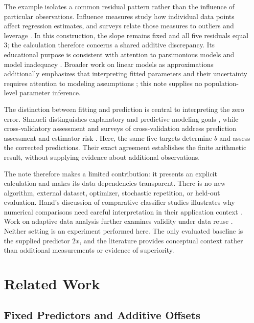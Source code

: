 \documentclass[11pt]{article}
\begin{document}
The example isolates a common residual pattern rather than the influence of particular observations. Influence measures study how individual data points affect regression estimates, and surveys relate those measures to outliers and leverage \cite{Cook1977DetectionInfluential,Chatterjee1986InfluentialObservations}. In this construction, the slope remains fixed and all five residuals equal $3$; the calculation therefore concerns a shared additive discrepancy. Its educational purpose is consistent with attention to parsimonious models and model inadequacy \cite{Box1976ScienceStatistics}. Broader work on linear models as approximations additionally emphasizes that interpreting fitted parameters and their uncertainty requires attention to modeling assumptions \cite{Buja2019ModelsAs}; this note supplies no population-level parameter inference.

The distinction between fitting and prediction is central to interpreting the zero error. Shmueli distinguishes explanatory and predictive modeling goals \cite{Shmueli2010ExplainOr}, while cross-validatory assessment and surveys of cross-validation address prediction assessment and estimator risk \cite{Stone1974CrossvalidatoryChoice,Arlot2010SurveyCrossvalidation}. Here, the same five targets determine $b$ and assess the corrected predictions. Their exact agreement establishes the finite arithmetic result, without supplying evidence about additional observations.

The note therefore makes a limited contribution: it presents an explicit calculation and makes its data dependencies transparent. There is no new algorithm, external dataset, optimizer, stochastic repetition, or held-out evaluation. Hand's discussion of comparative classifier studies illustrates why numerical comparisons need careful interpretation in their application context \cite{Hand2006ClassifierTechnology}. Work on adaptive data analysis further examines validity under data reuse \cite{Dwork2015ReusableHoldout}. Neither setting is an experiment performed here. The only evaluated baseline is the supplied predictor $2x$, and the literature provides conceptual context rather than additional measurements or evidence of superiority.

\section{Related Work}

\subsection{Fixed Predictors and Additive Offsets}
\end{document}
